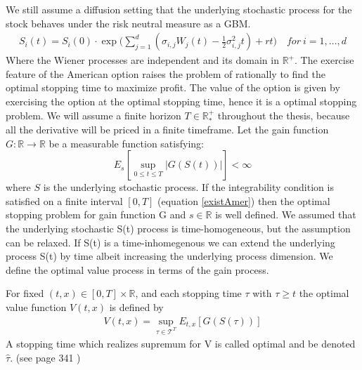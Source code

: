 We still assume a diffusion setting that the underlying stochastic process for the stock behaves under the risk neutral measure as a GBM.
\begin{equation*}
\begin{split}
S_i(t)=S_i(0) \cdot \exp \bigg( \sum_{j=1}^{d}(\sigma_{i,j} W_j(t) -\frac{1}{2} \sigma_{i,j}^2 t) + rt \bigg) \quad  for \ i=1,\ldots,d
\end{split}
\end{equation*}
Where the Wiener processes are independent and its domain in $\mathbb{R}^+$. The exercise feature of the American option raises the problem of rationally to find the optimal stopping time to maximize profit. The value of the option is given by exercising the option at the optimal stopping time, hence it is a optimal stopping problem. We will assume a finite horizon $T\in \mathbb{R}_*^+$ throughout the thesis, because all the derivative will be priced in a finite timeframe. Let the gain function $G:\mathbb{R}\to \mathbb{R}$ be a measurable function satisfying:
\begin{equation}\label{existAmer}
E_{s}[\sup_{0\leq t \leq T}|G(S(t))|] < \infty
\end{equation}
where $S$ is the underlying stochastic process. If the integrability condition is satisfied on a finite interval $[0,T]$ (equation \eqref{existAmer}) then the optimal stopping problem for gain function G and $s \in \mathbb{R}$ is well defined. We assumed that the underlying stochastic S(t) process is time-homogeneous, but the assumption can be relaxed. If S(t) is a time-inhomegenous we can extend the underlying process S(t) by time albeit increasing the underlying process dimension. We define the optimal value process in terms of the gain process.

\theoremstyle{definition}
\begin{definition}{}\label{optValFunc}
For fixed $(t,x)\in [0,T] \times \mathbb{R}$, and each stopping time $\tau$ with $\tau\geq t$ the optimal value function $V(t,x)$ is defined by
\begin{align}
V(t,x)= \sup_{\tau \in \mathcal{T}^T} E_{t,x}[G(S(\tau))]
\end{align}
A stopping time which realizes supremum for V is called optimal and be denoted $\hat{\tau}$.
(see page 341 \parencite{finKont})
\end{definition}


